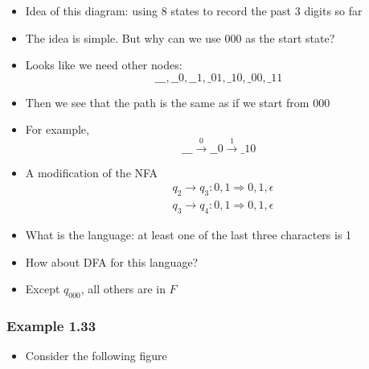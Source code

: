 \begin{frame}[allowframebreaks]
\begin{tikzpicture}
\end{tikzpicture}

\begin{itemize}
\item 
Idea of this diagram: using 8 states
to record the past 3 digits so far

\item The idea is simple. But 
why can we use 000 as the start state? 
\item Looks like we need other nodes:
  \begin{equation*}
    \_\_\_,
    \_\_0,
    \_\_1,
    \_01,
    \_10,
    \_00,
    \_11 
\end{equation*}
\item Then we see that the path is the same as if
  we start from  000
\item For example,
  \begin{equation*}
    \_\_\_ \xrightarrow{0}
    \_\_0 \xrightarrow{1}
    \_10
  \end{equation*}

\item A modification of the NFA 
  \begin{equation*}
    \begin{split}
& q_2 \rightarrow q_3:0,1 \Rightarrow 0,1,\epsilon\\
& q_3 \rightarrow q_4:0,1 \Rightarrow 0,1,\epsilon
\end{split}
\end{equation*}
\framebreak
\begin{center}
    \end{center}

  \item What is the language: at least one of the last three characters
    is 1
\item How about DFA for this language?

\item [] Except $q_{000}$, all others are in $F$
\end{itemize}\end{frame} \begin{frame}[allowframebreaks] \frametitle{Example 1.33}
\begin{itemize}
\item Consider the following figure
    \begin{center}
\end{center}
\end{itemize}
\end{frame}
